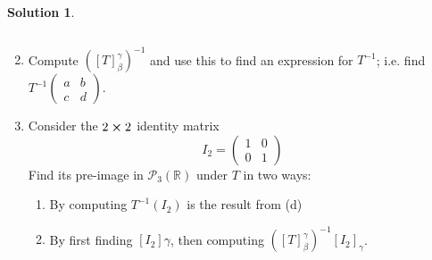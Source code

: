 \documentclass[10pt]{article}
\theoremstyle{definition}
\newtheorem{soln}{Solution}
\begin{document}
\begin{soln}
\begin{enumerate}[label=(\alph*)]
$$          $$
    \item Compute $\left(\left[T\right]_\beta^\gamma\right)^{-1}$ and use this to find an expression for $T^{-1}$; i.e. find $T^{-1}\begin{pmatrix}
              a & b \\
              c & d
            \end{pmatrix}$.
    \item Consider the $2\cross 2$ identity matrix
          $$I_2=\begin{pmatrix}
              1 & 0 \\
              0 & 1
            \end{pmatrix}$$
          Find its pre-image in $\mathcal{P}_3(\mathbb{R})$ under $T$ in two ways:
          \begin{enumerate}[label=(\roman*)]
            \item By computing $T^{-1}(I_2)$ is the result from (d)
            \item By first finding $\left[I_2\right]\gamma$, then computing $\left(\left[T\right]_\beta^\gamma\right)^{-1}\left[I_2\right]_\gamma$.
          \end{enumerate}
  \end{enumerate}
\end{soln}
\end{document}
